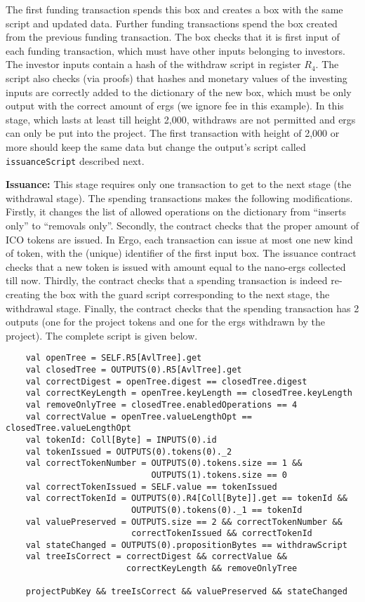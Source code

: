 \documentclass[runningheads]{llncs}
\begin{document}

The first funding transaction spends this box and creates a box with the same script and updated data. Further funding transactions spend the box created from the previous funding transaction. The box checks that it is first input of each funding transaction, which must have other inputs belonging to investors. The investor inputs contain a hash of the withdraw script in register $R_4$. 
The script also checks (via proofs) that hashes and monetary values of the investing inputs are correctly added to the dictionary of the new box, which must be only output with the correct amount of ergs (we ignore fee in this example). 
In this stage, which lasts at least till height 2,000, withdraws are not permitted and ergs can only be put into the project. 
The first transaction with height of 2,000 or more should keep the same data but change the output's script called \texttt{issuanceScript} described next.

\textbf{Issuance:}
This stage requires only one transaction to get to the next stage (the withdrawal stage). The spending transactions makes the following modifications. Firstly, it changes the list of allowed operations on the dictionary from ``inserts only'' to ``removals only''.
Secondly, the contract checks that the proper amount of ICO tokens are issued. In Ergo, each transaction can issue at most one new kind of token, with the (unique) identifier of the first input box. The issuance contract checks that a new token is issued with amount equal to the nano-ergs collected till now. Thirdly, the contract checks that a spending transaction is indeed re-creating the box with the guard script corresponding to the next stage, the withdrawal stage. 
Finally, the contract checks that the spending transaction has 2 outputs (one for the project tokens and one for the ergs withdrawn by the project).
The complete script is given below.
\small{
	\begin{verbatim}
	val openTree = SELF.R5[AvlTree].get
	val closedTree = OUTPUTS(0).R5[AvlTree].get
	val correctDigest = openTree.digest == closedTree.digest
	val correctKeyLength = openTree.keyLength == closedTree.keyLength
	val removeOnlyTree = closedTree.enabledOperations == 4
	val correctValue = openTree.valueLengthOpt == closedTree.valueLengthOpt
	val tokenId: Coll[Byte] = INPUTS(0).id
	val tokenIssued = OUTPUTS(0).tokens(0)._2
	val correctTokenNumber = OUTPUTS(0).tokens.size == 1 && 
	                         OUTPUTS(1).tokens.size == 0
	val correctTokenIssued = SELF.value == tokenIssued
	val correctTokenId = OUTPUTS(0).R4[Coll[Byte]].get == tokenId &&
	                     OUTPUTS(0).tokens(0)._1 == tokenId
	val valuePreserved = OUTPUTS.size == 2 && correctTokenNumber && 
	                     correctTokenIssued && correctTokenId
	val stateChanged = OUTPUTS(0).propositionBytes == withdrawScript
	val treeIsCorrect = correctDigest && correctValue && 
	                    correctKeyLength && removeOnlyTree
	
	projectPubKey && treeIsCorrect && valuePreserved && stateChanged
	\end{verbatim}
}
\end{document}
